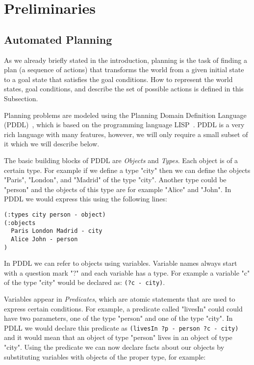 \documentclass[runningheads]{llncs}
\begin{document}
\section{Preliminaries}

\subsection{Automated Planning}
As we already briefly stated in the introduction, planning is the task of finding a plan (a sequence of
actions) that transforms the world from a given initial state to a goal state that satisfies the
goal conditions. How to represent the world states, goal conditions, and describe the set of possible actions is
defined in this Subsection.

Planning problems are modeled using the Planning Domain Definition Language (PDDL)~\cite{TODO}, which is
based on the programming language LISP~\cite{TODO}. PDDL is a very rich language with many features, however, we
will only require a small subset of it which we will describe below.

The basic building blocks of PDDL are \emph{Objects} and \emph{Types}. Each object is of a certain
type. For example if we define a type "city" then we can define the objects "Paris", "London", and "Madrid" of
the type "city". Another type could be "person" and the objects of this type are for example "Alice" and "John".
In PDDL we would express this using the following lines:

\begin{verbatim}
(:types city person - object)
(:objects 
  Paris London Madrid - city
  Alice John - person
)
\end{verbatim}

In PDDL we can refer to objects using variables. Variable names always start with a question mark "?" and each
variable has a type. For example a variable "c" of the type "city" would be declared as: \verb _(?c - city)_.

Variables appear in \emph{Predicates}, which are atomic statements that are used to express certain
conditions. For example, a predicate called "livesIn" could could have two parameters, one of the type "person"
and one of the type "city". In PDLL we would declare this predicate as \verb _(livesIn ?p - person ?c - city)_
and it would mean that an object of type "person" lives in an object of type "city". Using the predicate
we can now declare facts about our objects by substituting variables with objects of the proper type, for example:
\end{document}
